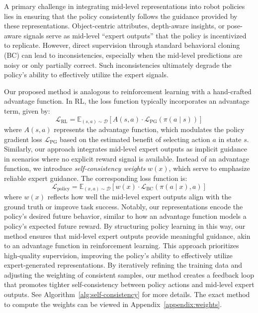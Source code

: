 \documentclass[conference,dvipsnames]{IEEEtran}
\begin{document}
A primary challenge in integrating mid-level representations into robot policies lies in ensuring that the policy consistently follows the guidance provided by these representations. Object-centric attributes, depth-aware insights, or pose-aware signals serve as mid-level “expert outputs” that the policy is incentivized to replicate. However, direct supervision through standard behavioral cloning (BC) can lead to inconsistencies, especially when the mid-level predictions are noisy or only partially correct. Such inconsistencies ultimately degrade the policy’s ability to effectively utilize the expert signals.

Our proposed method is analogous to reinforcement learning with a hand-crafted advantage function. In RL, the loss function typically incorporates an advantage term, given by:
\[
\mathcal{L}_{\text{RL}} = \mathbb{E}_{(s, a) \sim \mathcal{D}} \left[ A(s, a) \cdot \mathcal{L}_{\text{PG}} \left( \pi(a \mid s) \right) \right]
\]
where $A(s, a)$ represents the advantage function, which modulates the policy gradient loss $\mathcal{L}_{\text{PG}}$ based on the estimated benefit of selecting action $a$ in state $s$. Similarly, our approach integrates mid-level expert outputs as implicit guidance in scenarios where no explicit reward signal is available. Instead of an advantage function, we introduce \emph{self-consistency weights} \( w(x) \), which serve to emphasize reliable expert guidance. The corresponding loss function is:
\[
\mathcal{L}_{\text{policy}} = \mathbb{E}_{(x, a) \sim \mathcal{D}} \left[ w(x) \cdot \mathcal{L}_{\text{BC}} \left( \pi(a \mid x), a \right) \right]
\]
where $w(x)$ reflects how well the mid-level expert outputs align with the ground truth or improve task success. Notably, our representations encode the policy's desired future behavior, similar to how an advantage function models a policy's expected future reward. By structuring policy learning in this way, our method ensures that mid-level expert outputs provide meaningful guidance, akin to an advantage function in reinforcement learning. This approach prioritizes high-quality supervision, improving the policy's ability to effectively utilize expert-generated representations. By iteratively refining the training data and adjusting the weighting of consistent samples, our method creates a feedback loop that promotes tighter self-consistency between policy actions and mid-level expert outputs. See Algorithm~\ref{alg:self-consistency} for more details. The exact method to compute the weights can be viewed in Appendix~\ref{appendix:weights}.
\end{document}
